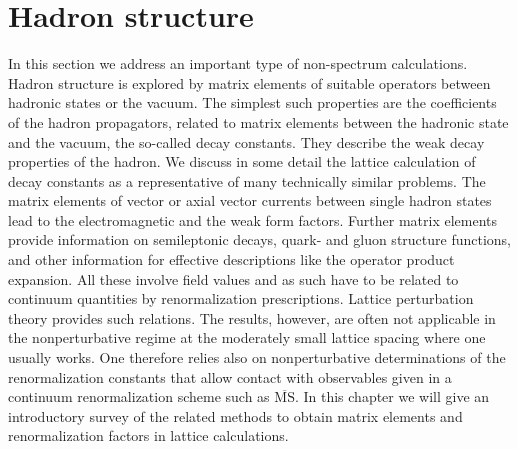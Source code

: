 \chapter{Hadron structure}

In this section we address an important type of non-spectrum calculations.
Hadron structure is explored by matrix elements of suitable operators between hadronic states or the vacuum. The simplest such properties are the
coefficients of the hadron propagators, related to matrix elements between the
hadronic state and the vacuum, the so-called decay constants. They describe
the weak decay properties of the hadron. We discuss in some detail the lattice
calculation of decay constants as a representative of many technically similar
problems.
The matrix elements of vector or axial vector currents between single
hadron states lead to the electromagnetic and the weak form factors. Further matrix elements provide information on semileptonic decays, quark- and
gluon structure functions, and other information for effective descriptions like
the operator product expansion.
All these involve field values and as such have to be related to continuum quantities by renormalization prescriptions. Lattice perturbation theory
provides such relations. The results, however, are often not applicable in the
nonperturbative regime at the moderately small lattice spacing where one
usually works. One therefore relies also on nonperturbative determinations of
the renormalization constants that allow contact with observables given in a
continuum renormalization scheme such as $\overline{\mathrm{MS}}$.
In this chapter we will give an introductory survey of the related methods
to obtain matrix elements and renormalization factors in lattice calculations.

